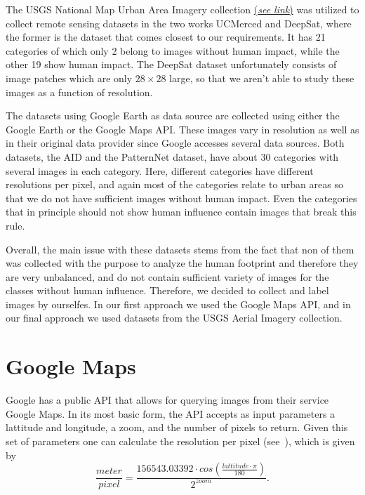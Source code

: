 The USGS National Map Urban Area Imagery collection \href{https://earthexplorer.usgs.gov/}{(\textit{see link})} was utilized to collect remote sensing datasets in the two works UCMerced and DeepSat, where the former is the dataset that comes closest to our requirements. It has 21 categories of which only 2 belong to images without human impact, while the other 19 show human impact. The DeepSat dataset unfortunately consists of image patches which are only $28 \times 28$ large, so that we aren't able to study these images as a function of resolution.

The datasets using Google Earth as data source are collected using either the Google Earth or the Google Maps API. These images vary in resolution as well as in their original data provider since Google accesses several data sources. 
Both datasets, the AID and the PatternNet dataset, have about 30 categories with several images in each category. Here, different categories have different resolutions per pixel, and again most of the categories relate to urban areas so that we do not have sufficient images without human impact. Even the categories that in principle should not show human influence contain images that break this rule.

Overall, the main issue with these datasets stems from the fact that non of them was collected with the purpose to analyze the human footprint and therefore they are very unbalanced, and do not contain sufficient variety of images for the classes without human influence. Therefore, we decided to collect and label images by ourselfes. In our first approach we used the Google Maps API, and in our final approach we used datasets from the USGS Aerial Imagery collection.

\section{Google Maps}

Google has a public API that allows for querying images from their service Google Maps. In its most basic form, the API accepts as input parameters a lattitude and longitude, a zoom, and the number of pixels to return. Given this set of parameters one can calculate the resolution per pixel (see~\parencite{gmaps_res_per_m}), which is given by
\begin{equation}
\frac{meter}{pixel} = \frac{156543.03392 \cdot cos(\frac{lattitude \cdot \pi}{180})}{2 ^ {zoom}}.
\end{equation}



